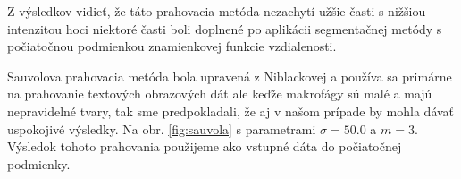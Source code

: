 \documentclass[a4paper,11pt,oneside]{article}%
\begin{document}
Z výsledkov vidieť, že táto prahovacia metóda nezachytí užšie časti s nižšiou intenzitou hoci niektoré časti boli doplnené po aplikácii segmentačnej metódy s počiatočnou podmienkou znamienkovej funkcie vzdialenosti. 

Sauvolova prahovacia metóda bola upravená z Niblackovej a používa sa primárne na prahovanie textových obrazových dát ale keďže makrofágy sú malé a majú nepravidelné tvary, tak sme predpokladali, že aj v našom prípade by mohla dávať uspokojivé výsledky. Na obr. \ref{fig:sauvola} s parametrami $\sigma = 50.0$ a $m = 3$. Výsledok tohoto prahovania použijeme ako vstupné dáta do počiatočnej podmienky.

\begin{figure}[H]  
    \hspace{5px}
    \subfloat[] 

\end{figure}
\end{document}
